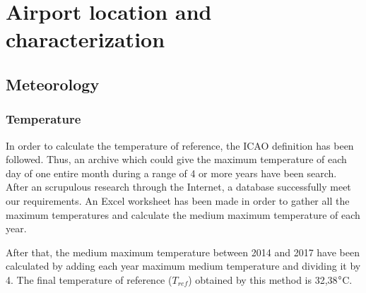 \chapter{Airport location and characterization}

	\section{Meteorology}
		\subsection{Temperature}
		In order to calculate the temperature of reference, the ICAO definition has been followed. Thus, an archive which could give the maximum temperature of each day of one entire month during a range of 4 or more years have been search. After an scrupulous research through the Internet, a database successfully meet our requirements. An Excel worksheet has been made in order to gather all the maximum temperatures and calculate the medium maximum temperature of each year. 
		
		After that, the medium maximum temperature between 2014 and 2017 have been calculated by adding each year maximum medium temperature and dividing it by 4. The final temperature of reference (\(T_{ref}\)) obtained by this method is 32,38\(\degree\)C. 
